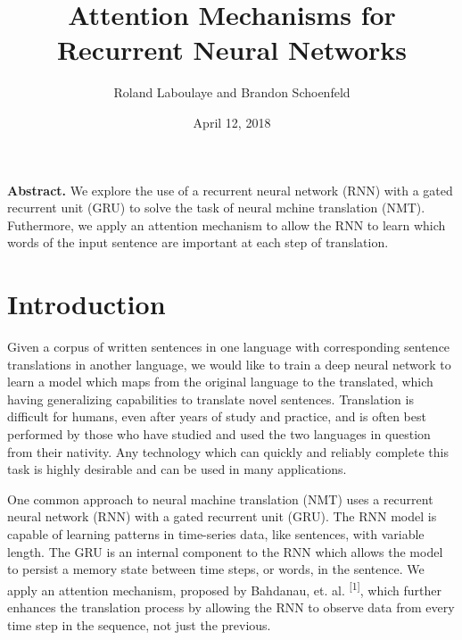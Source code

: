 \documentclass[letterpaper, 10pt]{article}
\begin{document}
\title{Attention Mechanisms for Recurrent Neural Networks}
\author{Roland Laboulaye and Brandon Schoenfeld}
\date{April 12, 2018}
\maketitle

\begin{multicols}{2}

\noindent \textbf{Abstract.}
We explore the use of a recurrent neural network (RNN) with a gated recurrent unit (GRU) to solve
the task of neural mchine translation (NMT). Futhermore, we apply an attention mechanism to allow
the RNN to learn which words of the input sentence are important at each step of translation.

\section{Introduction}
Given a corpus of written sentences in one language with corresponding sentence translations in
another language, we would like to train a deep neural network to learn a model which maps from the
original language to the translated, which having generalizing capabilities to translate novel
sentences.
Translation is difficult for humans, even after years of study and practice, and is often best
performed by those who have studied and used the two languages in question from their nativity.
Any technology which can quickly and reliably complete this task is highly desirable and can be used
in many applications.

One common approach to neural machine translation (NMT) uses a recurrent neural network (RNN) with
a gated recurrent unit (GRU).
The RNN model is capable of learning patterns in time-series data,
like sentences, with variable length.
The GRU is an internal component to the RNN which allows the model to persist a memory state between
time steps, or words, in the sentence.
We apply an attention mechanism, proposed by Bahdanau, et. al. \textsuperscript{[1]}, which further
enhances the translation process by allowing the RNN to observe data from every time step in the
sequence, not just the previous.


\end{multicols}
\end{document}
